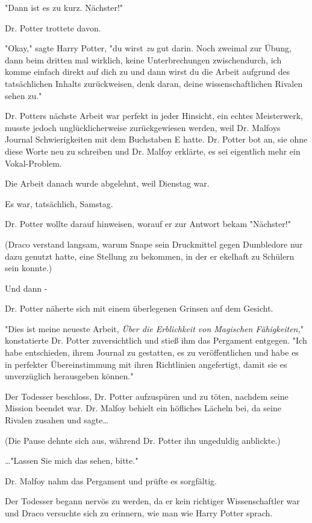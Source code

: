 {"Dann ist es zu kurz. Nächster!"

Dr. Potter trottete davon.

"Okay," sagte Harry Potter, "du wirst \emph{zu} gut darin. Noch zweimal zur Übung, dann beim dritten mal wirklich, keine Unterbrechungen zwischendurch, ich komme einfach direkt auf dich zu und dann wirst du die Arbeit aufgrund des tatsächlichen Inhalts zurückweisen, denk daran, deine wissenschaftlichen Rivalen sehen zu."

Dr. Potters nächste Arbeit war perfekt in jeder Hinsicht, ein echtes Meisterwerk, musste jedoch unglücklicherweise zurückgewiesen werden, weil Dr. Malfoys Journal Schwierigkeiten mit dem Buchstaben E hatte. Dr. Potter bot an, sie ohne diese Worte neu zu schreiben und Dr. Malfoy erklärte, es sei eigentlich mehr ein Vokal-Problem.

Die Arbeit danach wurde abgelehnt, weil Dienstag war.

Es war, tatsächlich, Samstag.

Dr. Potter wollte darauf hinweisen, worauf er zur Antwort bekam "Nächster!"

(Draco verstand langsam, warum Snape sein Druckmittel gegen Dumbledore nur dazu genutzt hatte, eine Stellung zu bekommen, in der er ekelhaft zu Schülern sein konnte.)

Und dann -

Dr. Potter näherte sich mit einem überlegenen Grinsen auf dem Gesicht.

"Dies ist meine neueste Arbeit, \emph{Über die Erblichkeit von Magischen Fähigkeiten,}" konstatierte Dr. Potter zuversichtlich und stieß ihm das Pergament entgegen. "Ich habe entschieden, ihrem Journal zu gestatten, es zu veröffentlichen und habe es in perfekter Übereinstimmung mit ihren Richtlinien angefertigt, damit sie es unverzüglich herausgeben können."

Der Todesser beschloss, Dr. Potter aufzuspüren und zu töten, nachdem seine Mission beendet war. Dr. Malfoy behielt ein höfliches Lächeln bei, da seine Rivalen zusahen und sagte…

(Die Pause dehnte sich aus, während Dr. Potter ihn ungeduldig anblickte.)

…"Lassen Sie mich das sehen, bitte."

Dr. Malfoy nahm das Pergament und prüfte es sorgfältig.

Der Todesser begann nervös zu werden, da er kein richtiger Wissenschaftler war und Draco versuchte sich zu erinnern, wie man wie Harry Potter sprach.

}
